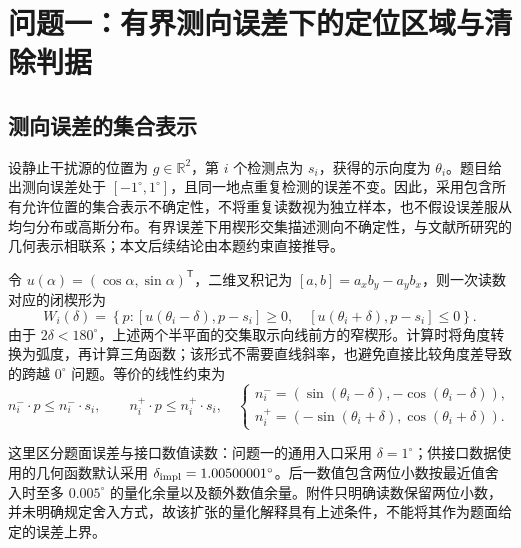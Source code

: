 \section{问题一：有界测向误差下的定位区域与清除判据}
\label{sec:q1}

\subsection{测向误差的集合表示}
设静止干扰源的位置为 $g\in\mathbb R^2$，第 $i$ 个检测点为 $s_i$，获得的示向度为 $\theta_i$。题目给出测向误差处于 $[-1^\circ,1^\circ]$，且同一地点重复检测的误差不变\cite{problem2026}。因此，采用包含所有允许位置的集合表示不确定性，不将重复读数视为独立样本，也不假设误差服从均匀分布或高斯分布。有界误差下用楔形交集描述测向不确定性，与文献\cite{tokekar2013}所研究的几何表示相联系；本文后续结论由本题约束直接推导。

令 $u(\alpha)=(\cos\alpha,\sin\alpha)^{\mathsf T}$，二维叉积记为 $[a,b]=a_xb_y-a_yb_x$，则一次读数对应的闭楔形为
\begin{equation}
 W_i(\delta)=\left\{p:
 [u(\theta_i-\delta),p-s_i]\geq0,\quad
 [u(\theta_i+\delta),p-s_i]\leq0\right\}.
 \label{eq:q1-wedge}
\end{equation}
由于 $2\delta<180^\circ$，上述两个半平面的交集取示向线前方的窄楔形。计算时将角度转换为弧度，再计算三角函数；该形式不需要直线斜率，也避免直接比较角度差导致的跨越 $0^\circ$ 问题。等价的线性约束为
\begin{equation}
 n_i^-\!\cdot p\leq n_i^-\!\cdot s_i,\qquad
 n_i^+\!\cdot p\leq n_i^+\!\cdot s_i,
 \quad
 \begin{cases}
 n_i^-=(\sin(\theta_i-\delta),-\cos(\theta_i-\delta)),\\
 n_i^+=(-\sin(\theta_i+\delta),\cos(\theta_i+\delta)).
 \end{cases}
 \label{eq:q1-halfplane}
\end{equation}

这里区分题面误差与接口数值读数：问题一的通用入口采用 $\delta=1^\circ$；供接口数据使用的几何函数默认采用 $\delta_{\rm impl}=1.00500001^\circ$。后一数值包含两位小数按最近值舍入时至多 $0.005^\circ$ 的量化余量以及额外数值余量。附件只明确读数保留两位小数，并未明确规定舍入方式，故该扩张的量化解释具有上述条件，不能将其作为题面给定的误差上界。

